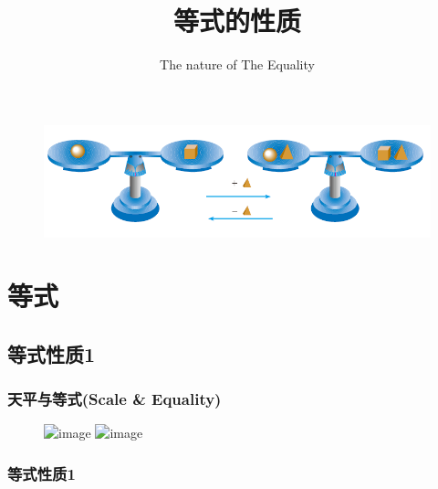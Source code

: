 
\usepackage{wallpaper}
\usepackage{enumerate}

\title{等式的性质}
\subtitle{The nature of The Equality}


\frame{\titlepage}
\begin{frame}
    \begin{figure}[c]
        \includegraphics[width=.6\textwidth]{assets/tianping.png}
    \end{figure}
\end{frame}

\section{等式}
\subsection{等式性质1}
\begin{frame}
    \frametitle{天平与等式(Scale \& Equality)}
    \begin{figure}
        \includegraphics<1,2>[width=.6\textwidth]{assets/tianping2.png}
        \includegraphics<3->[width=.45\textwidth]{assets/scale.png}
    \end{figure}
    
\end{frame}

\begin{frame}
    \frametitle{等式性质1}

    \vspace{1cm}  
    \pause
\end{frame}

